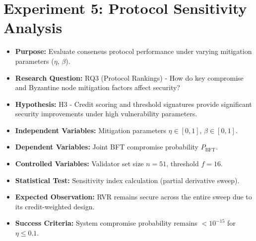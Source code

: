 \documentclass[12pt, oneside, a4paper]{report}
\theoremstyle{definition}
\theoremstyle{remark}
\begin{document}
\section{Experiment 5: Protocol Sensitivity Analysis}
\label{sec:ed:e5}
\begin{itemize}
  \item \textbf{Purpose:} Evaluate consensus protocol performance under varying mitigation parameters ($\eta$, $\beta$).
  \item \textbf{Research Question:} RQ3 (Protocol Rankings) - How do key compromise and Byzantine node mitigation factors affect security?
  \item \textbf{Hypothesis:} H3 - Credit scoring and threshold signatures provide significant security improvements under high vulnerability parameters.
  \item \textbf{Independent Variables:} Mitigation parameters $\eta \in [0, 1]$, $\beta \in [0, 1]$.
  \item \textbf{Dependent Variables:} Joint BFT compromise probability $P_{\mathrm{BFT}}$.
  \item \textbf{Controlled Variables:} Validator set size $n=51$, threshold $f=16$.
  \item \textbf{Statistical Test:} Sensitivity index calculation (partial derivative sweep).
  \item \textbf{Expected Observation:} RVR remains secure across the entire sweep due to its credit-weighted design.
  \item \textbf{Success Criteria:} System compromise probability remains $< 10^{-15}$ for $\eta \le 0.1$.
\end{itemize}
\end{document}

